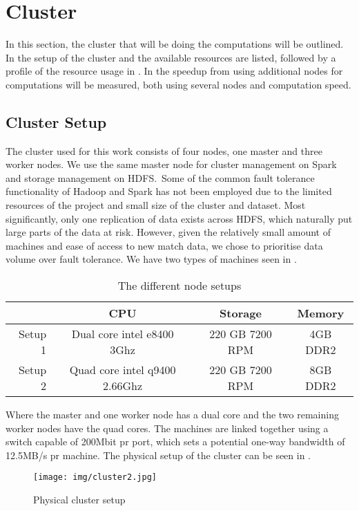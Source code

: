 \section{Cluster}\label{sec:cluster}
In this section, the cluster that will be doing the computations will be outlined. In  the setup of the cluster and the available resources are listed, followed by a profile of the resource usage in . In  the speedup from using additional nodes for computations will be measured, both using several nodes and computation speed.

\subsection{Cluster Setup}\label{sec:clustersetup}

The cluster used for this work consists of four nodes, one master and three worker nodes. We use the same master node for cluster management on Spark and storage management on HDFS.\ Some of the common fault tolerance functionality of Hadoop and Spark has not been employed due to the limited resources of the project and small size of the cluster and dataset. Most significantly, only one replication of data exists across HDFS, which naturally put large parts of the data at risk. However, given the relatively small amount of machines and ease of access to new match data, we chose to prioritise data volume over fault tolerance. We have two types of machines seen in .
\begin{table}[!htb]
  \centering
  \begin{tabular}{|r|ccc|}
    \hline
      & CPU & Storage & Memory \\\hline
    Setup 1 & Dual core intel e8400 3Ghz & 220 GB 7200 RPM & 4GB DDR2 \\
    Setup 2 & Quad core intel q9400 2.66Ghz & 220 GB 7200 RPM & 8GB DDR2 \\\hline
  \end{tabular}
  \caption{The different node setups}\label{tab:setups}
\end{table}

Where the master and one worker node has a dual core and the two remaining worker nodes have the quad cores. The machines are linked together using a switch capable of 200Mbit pr port, which sets a potential one-way bandwidth of 12.5MB/s pr machine. The physical setup of the cluster can be seen in .

\begin{figure}[!htb]
  \centering
    \texttt{[image: img/cluster2.jpg]}
  \caption{Physical cluster setup}\label{fig:clustersetup}
\end{figure}

